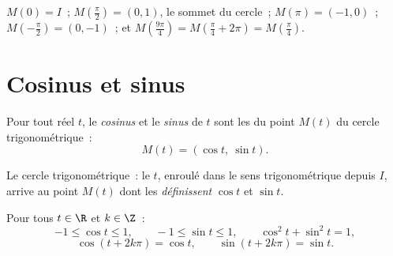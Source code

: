 \begin{example}
$M(0) = I$~; $M\!\left(\frac{\pi}{2}\right) = (0, 1)$, le sommet du
cercle~; $M(\pi) = (-1, 0)$~; $M\!\left(-\frac{\pi}{2}\right) =
(0, -1)$~; et $M\!\left(\frac{9\pi}{4}\right) =
M\!\left(\frac{\pi}{4} + 2\pi\right) = M\!\left(\frac{\pi}{4}\right)$.
\end{example}

\section{Cosinus et sinus}

\begin{definition}\label{def:g11:trigo:cossin}
Pour tout réel $t$, le \emph{cosinus} et le
\emph{sinus} de $t$ sont les  du point $M(t)$ du
cercle trigonométrique~:
\[
M(t) = (\cos t,\ \sin t).
\]
\end{definition}

\begin{omfigure}

{\small Le cercle trigonométrique~: le  $t$, enroulé dans le
sens trigonométrique depuis $I$, arrive au point $M(t)$ dont les
 \emph{définissent} $\cos t$ et $\sin t$.}
\end{omfigure}

\begin{proposition}\label{prop:g11:trigo:first}
Pour tous $t \in \R$ et $k \in \Z$~:
\[
-1 \leq \cos t \leq 1, \qquad
-1 \leq \sin t \leq 1, \qquad
\cos^2 t + \sin^2 t = 1,
\]
\[
\cos(t + 2k\pi) = \cos t, \qquad \sin(t + 2k\pi) = \sin t .
\]
\end{proposition}

